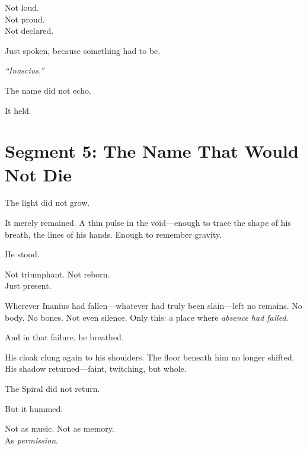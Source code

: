\documentclass[9pt]{article}
\begin{document}
\vspace{0.5em}
Not loud.\\
Not proud.\\
Not declared.

\vspace{0.5em}
Just spoken, because something had to be.

\vspace{0.5em}
\textit{``Inascius.''}

\vspace{0.5em}
The name did not echo.

\vspace{0.5em}
It held.

\newpage

\section*{Segment 5: The Name That Would Not Die}

The light did not grow.

\vspace{0.5em}
It merely remained. A thin pulse in the void---enough to trace the shape of his breath, the lines of his hands. Enough to remember gravity.

\vspace{0.5em}
He stood.

\vspace{0.5em}
Not triumphant. Not reborn.\\
Just present.

\vspace{0.5em}
Wherever Inanius had fallen---whatever had truly been slain---left no remains. No body. No bones. Not even silence. Only this: a place where \textit{absence had failed}.

\vspace{0.5em}
And in that failure, he breathed.

\vspace{0.5em}
His cloak clung again to his shoulders. The floor beneath him no longer shifted. His shadow returned---faint, twitching, but whole.

\vspace{0.5em}
The Spiral did not return.

\vspace{0.5em}
But it hummed.

\vspace{0.5em}
Not as music. Not as memory.\\
As \textit{permission}.
\end{document}
